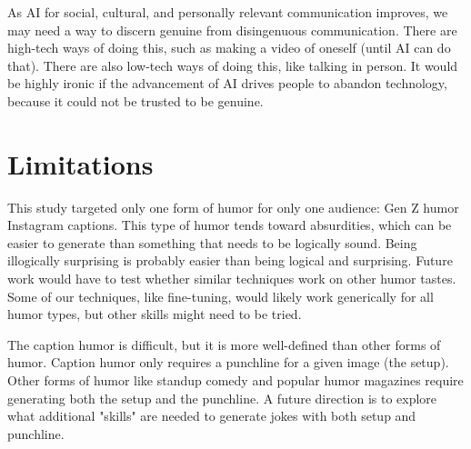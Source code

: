 As AI for social, cultural, and personally relevant communication improves, we may need a way to discern genuine from disingenuous communication. There are high-tech ways of doing this, such as making a video of oneself (until AI can do that). There are also low-tech ways of doing this, like talking in person. It would be highly ironic if the advancement of AI drives people to abandon technology, because it could not be trusted to be genuine. 











\section{Limitations}
This study targeted only one form of humor for only one audience:  Gen Z humor Instagram captions. This type of humor tends toward absurdities, which can be easier to generate than something that needs to be logically sound. Being illogically surprising is probably easier than being logical and surprising. Future work would have to test whether similar techniques work on other humor tastes. Some of our techniques, like fine-tuning, would likely work generically for all humor types, but other skills might need to be tried.

The caption humor is difficult, but it is more well-defined than other forms of humor. Caption humor only requires a punchline for a given image (the setup). Other forms of humor like standup comedy and popular humor magazines require generating both the setup and the punchline. A future direction is to explore what additional "skills" are needed to generate jokes with both setup and punchline. 

